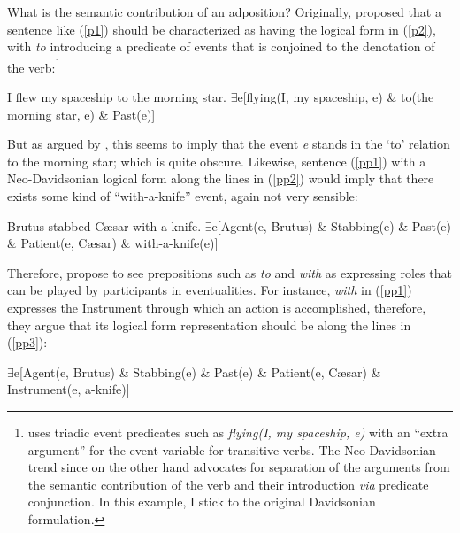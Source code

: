 \documentclass[output=paper]{langsci/langscibook}
\begin{document}
\largerpage[-2]
What is the semantic contribution of an adposition? Originally,
\citet{Davidson1967} proposed that a sentence like (\ref{p1}) should be
characterized as having the logical form in (\ref{p2}), with \emph{to}
introducing a predicate of events that is conjoined to the denotation of the
verb:\footnote{\citet{Davidson1967} uses triadic event predicates such as
    \emph{flying(I, my spaceship, e)} with an \enquote{extra argument} for the
    event variable for transitive verbs.  The Neo-Davidsonian trend since
    \citet{castaneda1967} on the other hand advocates for separation of the
    arguments from the semantic contribution of the verb and their introduction
    \emph{via} predicate conjunction. In this example, I stick to the original
Davidsonian formulation.}

\begin{exe}
\ex
\begin{xlista}
\ex \label{p1} I flew my spaceship to the morning star.
\ex \label{p2} $\exists$e[flying(I, my spaceship, e) \& to(the morning star, e) \& Past(e)]
\end{xlista}
\end{exe}

But as argued by \citet{larson.segal1995}, this seems to imply that the event
\emph{e} stands in the `to' relation to the morning star; which is quite
obscure. Likewise, sentence (\ref{pp1}) with a Neo-Davidsonian logical form
along the lines in (\ref{pp2}) would imply that there exists some kind of
``with-a-knife'' event, again not very sensible:

\begin{exe}
\ex
\begin{xlista}
\ex \label{pp1} Brutus stabbed C\ae{}sar with a knife.
\ex \label{pp2} $\exists$e[Agent(e, Brutus) \& Stabbing(e) \& Past(e) \& Patient(e, C\ae{}sar) \& with-a-knife(e)]
\end{xlista}
\end{exe}

Therefore, \citet{larson.segal1995} propose to see prepositions such as \emph{to} and \emph{with} as expressing roles that can be played by participants in eventualities. For instance, \emph{with} in (\ref{pp1}) expresses the Instrument through which an action is accomplished, therefore, they argue that its logical form representation should be along the lines in (\ref{pp3}):

\begin{exe}
\ex \label{pp3} $\exists$e[Agent(e, Brutus) \& Stabbing(e) \& Past(e) \& Patient(e, C\ae{}sar) \& Instrument(e, a-knife)]
\end{exe}
\end{document}
